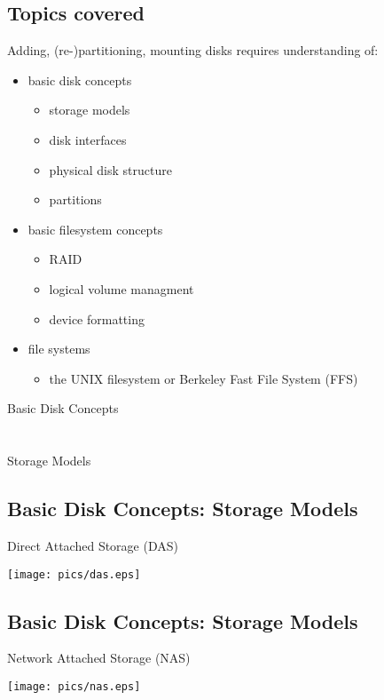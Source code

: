 \documentclass[xga]{xdvislides}
\begin{document}
\subsection{Topics covered}
Adding, (re-)partitioning, mounting disks requires understanding of:
\begin{itemize}
	\item basic disk concepts
		\begin{itemize}
			\item storage models
			\item disk interfaces
			\item physical disk structure
			\item partitions
		\end{itemize}
	\item basic filesystem concepts
		\begin{itemize}
			\item RAID
			\item logical volume managment
			\item device formatting
		\end{itemize}
	\item file systems
		\begin{itemize}
			\item the UNIX filesystem or Berkeley Fast File System (FFS)
		\end{itemize}
\end{itemize}

\newpage
\vspace*{\fill}
\begin{center}
	\Hugesize
		Basic Disk Concepts \\ [1em]
	\hspace*{5mm}
	\blueline\\
	\hspace*{5mm}\\
		Storage Models
\end{center}
\vspace*{\fill}

\subsection{Basic Disk Concepts: Storage Models}
Direct Attached Storage (DAS)
\vfill
\begin{center}
	\texttt{[image: pics/das.eps]} \\
\end{center}
\vfill

\subsection{Basic Disk Concepts: Storage Models}
Network Attached Storage (NAS)
\vfill
\begin{center}
	\texttt{[image: pics/nas.eps]} \\
\end{center}
\vfill
\end{document}
